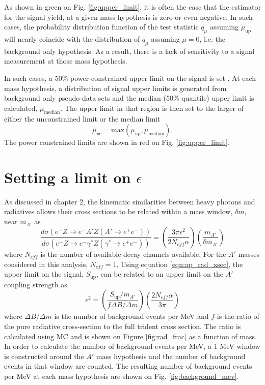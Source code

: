 As shown in green on Fig. \ref{fig:upper_limit}, it is often the case that the
estimator for the signal yield, at a given mass hypothesis is zero or
even negative.  In such cases, the probability distribution function of the
test statistic $q_{\mu}$ assuming $\mu_{\text{up}}$ will nearly coincide with 
the distribution of $q_{\mu}$ assuming $\mu = 0$, i.e. the background only 
hypothesis.  As a result, there is a lack of 
sensitivity to a signal measurement at those mass hypothesis.

In such cases, a 50\% power-constrained upper limit on the signal is set
\cite{Cowan:2011an}.
At each mass hypothesis, a distribution of signal upper limits is generated from
background only pseudo-data sets and the median (50\% quantile) upper limit
is calculated, $\mu_{\mbox{median}}$. The upper limit in that region is then set to 
the larger of either the unconstrained limit or the median limit
\begin{equation}
    \mu_{pc} = \mbox{max}(\mu_{\text{up}}, \mu_{\text{median}}).
\end{equation}
The power constrained limits are shown in red on Fig. \ref{fig:upper_limit}.

\section{Setting a limit on $\epsilon$}

As discussed in chapter 2, the kinematic similarities between heavy photons and 
radiatives allows their cross sections to be related within a mass window, 
$\delta m$, near $m_{A'}$ as 
\begin{equation}
    \frac{d\sigma(e^-Z \rightarrow e^-A'Z(A' \rightarrow e^+e^-))}{
    d\sigma(e^-Z \rightarrow e^-\gamma^*Z(\gamma^* \rightarrow e^+e^-))} = 
    \left( \frac{3 \pi \epsilon^2}{2 N_{eff} \alpha} \right)
        \left( \frac{m_{A'}}{\delta m_{A'}} \right)
    \label{eqn:ap_rad_xsec}
\end{equation}
where $N_{eff}$ is the number of available decay channels available.  For the 
$A'$ masses considered in this analysis, $N_{eff} = 1$. Using equation 
\ref{eqn:ap_rad_xsec}, the upper limit on the signal, $S_{\text{up}}$, can be related to an
upper limit on the $A'$ coupling strength as 
\begin{equation}
    \epsilon^2 = \left (\frac{S_{\text{up}}/m_{A'}}{
                f\Delta B/\Delta m} \right) 
                \left(\frac{2 N_{eff} \alpha}{3 \pi} \right)
    \label{eqn:eps}
\end{equation}
where $\Delta B/\Delta m$ is the number of 
background events per MeV and $f$ is the ratio of the pure radiative cross-section to the full trident 
cross section.  The ratio is calculated using MC and is shown on Figure \ref{fig:rad_frac} as 
a function of mass.
In order to calculate the number of background 
events per MeV, a 1 MeV window is constructed around the $A'$ mass hypothesis
and the number of background events in that window are counted.  The resulting 
number of background events per MeV at each mass hypothesis are shown on Fig. 
\ref{fig:background_mev}.  

